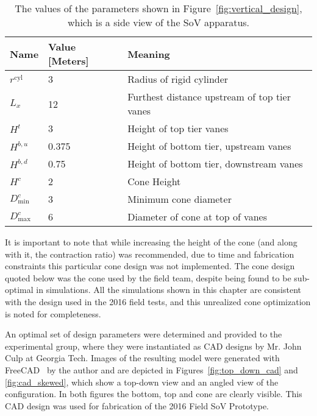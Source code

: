 \begin{table}[!htb]
 \caption{The values of the parameters shown in
 Figure~\ref{fig:vertical_design}, which is a side view of the SoV
 apparatus.} 
\centering
\begin{tabular}{l|l|l}
Name                        & Value [Meters] & Meaning                    \\
 \hline
$r^{\text{cyl}}$            &   3   & Radius of rigid cylinder \\
$L_x$                       &  12   & Furthest distance upstream of top	 tier vanes \\
 $H^t    $                  &   3   & Height of top tier vanes \\
 $H^{b,u}$                  & 0.375 & Height of bottom tier, upstream vanes \\
 $H^{b,d}$                  & 0.75  & Height of bottom tier, downstream vanes \\
 $H^{c}$                    &   2   & Cone Height \\
 $D^c_{\text{min}}    $     &   3   & Minimum cone diameter \\
 $D^c_{\text{max}}    $     &   6   & Diameter of cone at top of vanes\\
\end{tabular}
 \label{tab:side}
\end{table}

It is important to note that while increasing the height of the cone
(and along with it, the contraction ratio) was recommended, due to
time and fabrication constraints this particular cone design was not
implemented. The cone design quoted below was the cone used by
the field team, despite being found to be sub-optimal in
simulations. All the simulations shown in this chapter are consistent
with the design used in the 2016 field tests, and this unrealized cone
optimization is noted for completeness.


An optimal set of design parameters were determined and provided to the
experimental group, where they were instantiated as CAD designs by
Mr. John Culp at Georgia Tech. Images of the resulting model were generated
with FreeCAD~\cite{Falck} by the author and are
depicted in Figures~\ref{fig:top_down_cad} and \ref{fig:cad_skewed},
which show a top-down view and an angled 
view of the configuration. In both figures the bottom, top and cone are
clearly visible. This CAD design was used for
fabrication of the 2016 Field SoV Prototype. 

